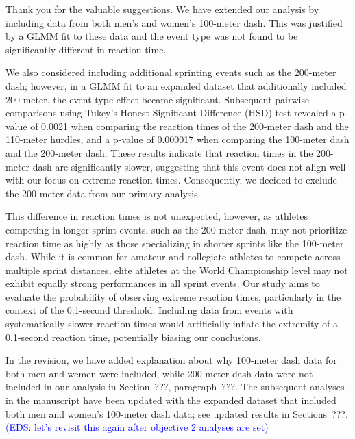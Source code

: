 \documentclass[12pt]{article}
\newcommand{\eds}[1]{\textcolor{blue}{(EDS: #1)}}
\begin{document}
Thank you for the valuable suggestions. We have extended our analysis
by including data from both men's and women's 100-meter dash. This was
justified by a GLMM fit to these data and the event type was not found
to be significantly different in reaction time.


We also considered including additional sprinting events such as the
200-meter dash; however, in a GLMM fit to an expanded dataset that
additionally included 200-meter, the event type effect became
significant. Subsequent pairwise comparisons using Tukey’s Honest
Significant Difference (HSD) test revealed a p-value of 0.0021 when
comparing the reaction times of the 200-meter dash and the 110-meter
hurdles, and a p-value of 0.000017 when comparing the 100-meter dash
and the 200-meter dash. These results indicate that reaction times in
the 200-meter dash are significantly slower, suggesting that this
event does not align well with our focus on extreme reaction times.
Consequently, we decided to exclude the 200-meter data from our
primary analysis.


This difference in reaction times is not unexpected, however, as athletes 
competing in longer sprint
events, such as the 200-meter dash, may not prioritize reaction time
as highly as those specializing in shorter sprints like the 100-meter
dash. While it is common for amateur and collegiate athletes to
compete across multiple sprint distances, elite athletes at the World
Championship level may not exhibit equally strong performances in all
sprint events. Our study aims to evaluate the probability of observing
extreme reaction times, particularly in the context of the 0.1-second
threshold. Including data from events with systematically slower
reaction times would artificially inflate the extremity of a
0.1-second reaction time, potentially biasing our conclusions.


In the revision, we have added explanation about why 100-meter dash
data for both men and wemen were included, while 200-meter dash data
were not included in our analysis in Section~???, paragraph~???.
The subsequent analyses in the manuscript have been updated with the
expanded dataset that included both men and women's 100-meter dash
data; see updated results in Sections~???.
\eds{let's revisit this again after objective 2 analyses are set}
\end{document}
